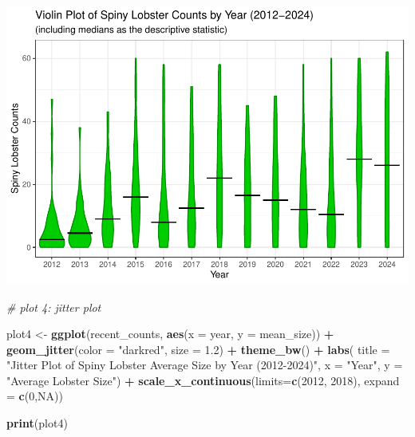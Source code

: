 \documentclass[
]{article}
\newenvironment{Shaded}{\begin{snugshade}}{\end{snugshade}}
\newcommand{\AttributeTok}[1]{\textcolor[rgb]{0.13,0.29,0.53}{#1}}
\newcommand{\CommentTok}[1]{\textcolor[rgb]{0.56,0.35,0.01}{\textit{#1}}}
\newcommand{\ConstantTok}[1]{\textcolor[rgb]{0.56,0.35,0.01}{#1}}
\newcommand{\DecValTok}[1]{\textcolor[rgb]{0.00,0.00,0.81}{#1}}
\newcommand{\FloatTok}[1]{\textcolor[rgb]{0.00,0.00,0.81}{#1}}
\newcommand{\FunctionTok}[1]{\textcolor[rgb]{0.13,0.29,0.53}{\textbf{#1}}}
\newcommand{\NormalTok}[1]{#1}
\newcommand{\OtherTok}[1]{\textcolor[rgb]{0.56,0.35,0.01}{#1}}
\newcommand{\SpecialCharTok}[1]{\textcolor[rgb]{0.81,0.36,0.00}{\textbf{#1}}}
\newcommand{\StringTok}[1]{\textcolor[rgb]{0.31,0.60,0.02}{#1}}
\begin{document}
\includegraphics{hw1-lobstrs-eds241_files/figure-latex/unnamed-chunk-28-3.pdf}

\begin{Shaded}
\begin{Highlighting}[]
\CommentTok{\# plot 4: jitter plot}

\NormalTok{plot4 }\OtherTok{\textless{}{-}} \FunctionTok{ggplot}\NormalTok{(recent\_counts, }\FunctionTok{aes}\NormalTok{(}\AttributeTok{x =}\NormalTok{ year, }\AttributeTok{y =}\NormalTok{ mean\_size)) }\SpecialCharTok{+}
    \FunctionTok{geom\_jitter}\NormalTok{(}\AttributeTok{color =} \StringTok{"darkred"}\NormalTok{, }\AttributeTok{size =} \FloatTok{1.2}\NormalTok{) }\SpecialCharTok{+}
    \FunctionTok{theme\_bw}\NormalTok{() }\SpecialCharTok{+}
    \FunctionTok{labs}\NormalTok{(}
        \AttributeTok{title =} \StringTok{"Jitter Plot of Spiny Lobster Average Size by Year (2012{-}2024)"}\NormalTok{,}
        \AttributeTok{x =} \StringTok{"Year"}\NormalTok{,}
        \AttributeTok{y =} \StringTok{"Average Lobster Size"}\NormalTok{) }\SpecialCharTok{+}
     \FunctionTok{scale\_x\_continuous}\NormalTok{(}\AttributeTok{limits=}\FunctionTok{c}\NormalTok{(}\DecValTok{2012}\NormalTok{, }\DecValTok{2018}\NormalTok{), }\AttributeTok{expand =} \FunctionTok{c}\NormalTok{(}\DecValTok{0}\NormalTok{,}\ConstantTok{NA}\NormalTok{))}
    

\FunctionTok{print}\NormalTok{(plot4)}
\end{Highlighting}
\end{Shaded}
\end{document}
